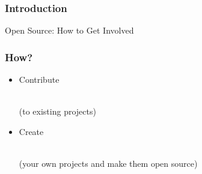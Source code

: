 \documentclass{beamer}
\begin{document}
\begin{frame}
  \frametitle{Introduction}
 \begin{center}\begin{LARGE}Open Source: How to Get Involved\end{LARGE}\end{center}
\end{frame}

\begin{frame}
  \frametitle{How?}
  \begin{itemize}
    \setlength{\itemsep}{2em}
  \item \begin{LARGE} Contribute \end{LARGE} \\ (to existing projects)
  \item \begin{LARGE} Create \end{LARGE} \\ (your own projects and make them open source)
  \end{itemize}
\end{frame}
\end{document}
